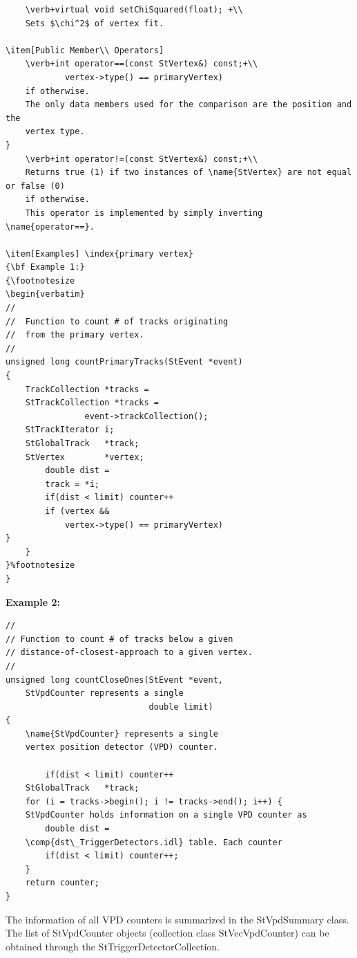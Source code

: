 \begin{Entry}
\begin{Entry}
{\begin{verbatim}
    \verb+virtual void setChiSquared(float); +\\
    Sets $\chi^2$ of vertex fit.

\item[Public Member\\ Operators]
    \verb+int operator==(const StVertex&) const;+\\
            vertex->type() == primaryVertex)      
    if otherwise.
    The only data members used for the comparison are the position and the
    vertex type.
}  
    \verb+int operator!=(const StVertex&) const;+\\
    Returns true (1) if two instances of \name{StVertex} are not equal or false (0)
    if otherwise.
    This operator is implemented by simply inverting \name{operator==}.

\item[Examples] \index{primary vertex}
{\bf Example 1:}
{\footnotesize
\begin{verbatim}
//
//  Function to count # of tracks originating
//  from the primary vertex.
//
unsigned long countPrimaryTracks(StEvent *event)
{
    TrackCollection *tracks = 
    StTrackCollection *tracks =
                event->trackCollection();
    StTrackIterator i;
    StGlobalTrack   *track;
    StVertex        *vertex;
        double dist = 
        track = *i;
        if(dist < limit) counter++  
        if (vertex &&
            vertex->type() == primaryVertex)
}  
    }
}%footnotesize    
}
\end{verbatim}
}%

{\bf Example 2:}
{\footnotesize
\begin{verbatim}
//
// Function to count # of tracks below a given
// distance-of-closest-approach to a given vertex.
//
unsigned long countCloseOnes(StEvent *event,
    StVpdCounter represents a single 
                             double limit)
{
    \name{StVpdCounter} represents a single 
    vertex position detector (VPD) counter.  
    
        if(dist < limit) counter++
    StGlobalTrack   *track;
    for (i = tracks->begin(); i != tracks->end(); i++) {
    StVpdCounter holds information on a single VPD counter as
        double dist =
    \comp{dst\_TriggerDetectors.idl} table. Each counter
        if(dist < limit) counter++;
    }
    return counter;
}
\end{verbatim}


    The information of all VPD counters is summarized in the StVpdSummary class.
    The list of StVpdCounter objects (collection class StVecVpdCounter) can be obtained
    through the StTriggerDetectorCollection.
}
\end{Entry}
\end{Entry}
